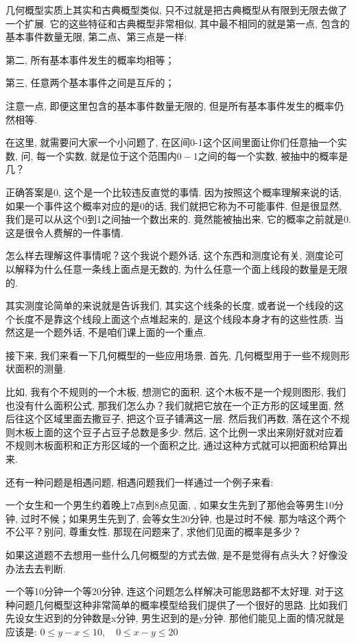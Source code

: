 几何概型实质上其实和古典概型类似, 只不过就是把古典概型从有限到无限去做了一个扩展. 它的这些特征和古典概型非常相似, 其中最不相同的就是第一点, 包含的基本事件数量无限, 第二点、第三点是一样: 

第二, 所有基本事件发生的概率均相等；

第三, 任意两个基本事件之间是互斥的；

注意一点, 即便这里包含的基本事件数量无限的, 但是所有基本事件发生的概率仍然相等. 

在这里, 就需要问大家一个小问题了, 在区间0-1这个区间里面让你们任意抽一个实数, 问, 每一个实数, 就是位于这个范围内$0-1$之间的每一个实数, 被抽中的概率是几？

正确答案是0, 这个是一个比较违反直觉的事情. 因为按照这个概率理解来说的话, 如果一个事件这个概率对应的是0的话, 我们就把它称为不可能事件. 但是很显然, 我们是可以从这个0到1之间抽一个数出来的. 竟然能被抽出来, 它的概率之前就是0. 这是很令人费解的一件事情. 

怎么样去理解这件事情呢？这个我说个题外话, 这个东西和测度论有关, 测度论可以解释为什么任意一条线上面点是无数的, 为什么任意一个面上线段的数量是无限的. 

其实测度论简单的来说就是告诉我们, 其实这个线条的长度, 或者说一个线段的这个长度不是靠这个线段上面这个点堆起来的, 是这个线段本身才有的这些性质. 当然这是一个题外话, 不是咱们课上面的一个重点. 

接下来, 我们来看一下几何概型的一些应用场景. 首先, 几何概型用于一些不规则形状面积的测量. 

比如, 我有个不规则的一个木板, 想测它的面积. 这个木板不是一个规则图形, 我们也没有什么面积公式, 那我们怎么办？我们就把它放在一个正方形的区域里面, 然后往这个区域里面去撒豆子, 把这个豆子铺满这一层. 然后我们再数, 落在这个不规则木板上面的这个豆子占豆子总数是多少. 然后, 这个比例一求出来刚好就对应着不规则木板面积和正方形区域的一个面积之比, 通过这种方式就可以把面积给算出来. 

还有一种问题是相遇问题, 相遇问题我们一样通过一个例子来看: 

一个女生和一个男生约着晚上7点到8点见面, , 如果女生先到了那他会等男生10分钟, 过时不候；如果男生先到了, 会等女生20分钟, 也是过时不候. 那为啥这个两个不公平？别问, 尊重女性. 那现在问题来了, 求他们见面的概率是多少？

如果这道题不去想用一些什么几何概型的方式去做, 是不是觉得有点头大？好像没办法去去判断. 

一个等10分钟一个等20分钟, 连这个问题怎么样解决可能思路都不太好理. 对于这种问题几何概型这种非常简单的概率模型给我们提供了一个很好的思路. 比如我们先设女生迟到的分钟数是x分钟, 男生迟到的是y分钟. 那他们能见上面的情况就是应该是: $0 \le y-x \le 10, \quad 0 \le x-y \le 20$

